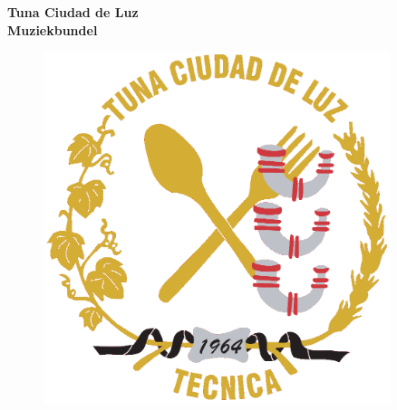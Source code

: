 \documentclass[10pt,a4paper,twoside]{article}
\begin{document}
\begin{titlepage}
\begin{center}
\textcolor[RGB]{212,175,55}{\textbf{\Huge Tuna Ciudad de Luz \\Muziekbundel}}
\vfill
\end{center}
\begin{figure}[h]
\centering
\includegraphics[width=0.9\textwidth]{logo}
\end{figure}
\vfill
\end{titlepage}
\end{document}
